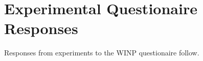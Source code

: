 \section{Experimental Questionaire Responses}
\label{sec:Experiments}

Responses from experiments to the WINP questionaire follow.


